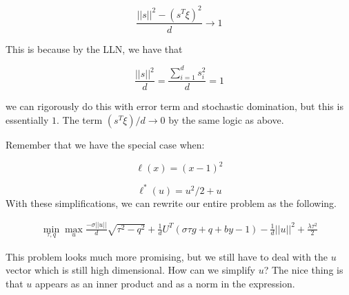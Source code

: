  
 $$\frac{||s||^2 - (s^T\xi)^2}{d} \longrightarrow 1$$
 
 This is because by the LLN, we have that
 
 $$\frac{||s||^2}{d} = \frac{\sum_{i=1}^d s_i^2}{d } = 1$$
 
 we can rigorously do this with error term and stochastic domination, but this is essentially $1$. The term $(s^T\xi)/d \longrightarrow 0$ by the same logic as above.
 
 
 Remember that we have the special case when: 
 
 
 $$\ell(x) = (x-1)^2$$ 
 
 $$\ell^*(u) = u^2/2 + u$$
  With these simplifications, we can rewrite our entire problem as the following.

 
 \begin{align*}
     \min_{\tau, q} \max_{u} \frac{-\sigma||u||}{d}\sqrt{\tau^2 - q^2} + \frac{1}{d}U^T(\sigma \tau g + q + by - 1) - \frac{1}{d}||u||^2 + \frac{\lambda\tau^2}{2}
 \end{align*}
 
 This problem looks much more promising, but we still have to deal with the $u$ vector which is still high dimensional. How can we simplify $u$? The nice thing is that $u$ appears as an inner product and as a norm in the expression.